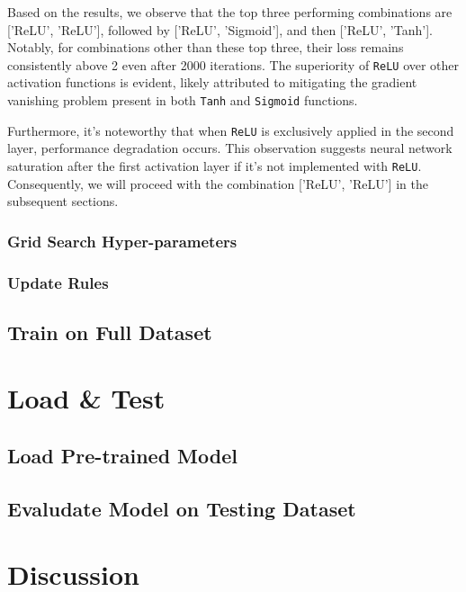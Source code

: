 \documentclass[10pt,a4paper,twoside]{tau}
\begin{document}
Based on the results, we observe that the top three performing combinations are ['ReLU', 'ReLU'], followed by ['ReLU', 'Sigmoid'], and then ['ReLU', 'Tanh']. Notably, for combinations other than these top three, their loss remains consistently above 2 even after 2000 iterations. The superiority of \texttt{ReLU} over other activation functions is evident, likely attributed to mitigating the gradient vanishing problem present in both \texttt{Tanh} and \texttt{Sigmoid} functions.

Furthermore, it's noteworthy that when \texttt{ReLU} is exclusively applied in the second layer, performance degradation occurs. This observation suggests neural network saturation after the first activation layer if it's not implemented with \texttt{ReLU}. Consequently, we will proceed with the combination ['ReLU', 'ReLU'] in the subsequent sections.


\subsubsection{Grid Search Hyper-parameters}

\subsubsection{Update Rules}

\subsection{Train on Full Dataset}

\section{Load \& Test}

\subsection{Load Pre-trained Model}

\subsection{Evaludate Model on Testing Dataset }

\section{Discussion}
\end{document}
